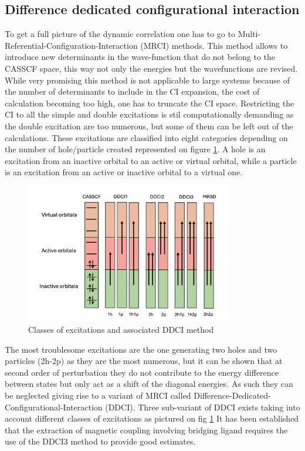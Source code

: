\documentclass[10pt]{report}
\numberwithin{equation}{section}
\begin{document}
\subsection{Difference dedicated configurational interaction}

To get a full picture of the dynamic correlation one has to go to Multi-Referential-Configuration-Interaction (MRCI) methods.
This method allows to introduce new determinants in the wave-function that do not belong to the CASSCF space, this way not only the energies but the wavefunctions are revised.
While very promising this method is not applicable to large systems because of the number of determinants to include in the CI expansion, the cost of calculation becoming too high, one has to truncate the CI space.
Restricting the CI to all the simple and double excitations is stil computationally demanding as the double excitation are too numerous, but some of them can be left out of the calculations. 
These excitations are classified into eight categories depending on the number of hole/particle created represented on figure \ref{DDCI}. 
A hole is an excitation from an inactive orbital to an active or virtual orbital, while a particle is an excitation from an active or inactive orbital to a virtual one.

\begin{figure}
    \centering
    \includegraphics[width=0.8\textwidth]{Images/DDCI.png}
    \caption{Classes of excitations and associated DDCI method}
    \label{DDCI}
\end{figure}
The most troublesome excitations are the one generating two holes and two particles (2h-2p) as they are the most numerous, but it can be shown that at second order of perturbation they do not contribute to the energy difference between states but only act as a shift of the diagonal energies.
As such they can be neglected giving rise to a variant of MRCI called Difference-Dedicated-Configurational-Interaction (DDCI). 
Three sub-variant of DDCI exists taking into account different classes of excitations as pictured on fig \ref{DDCI}
It has been established that the extraction of magnetic coupling involving bridging ligand requires the use of the DDCI3 method to provide good estimates.
\end{document}
